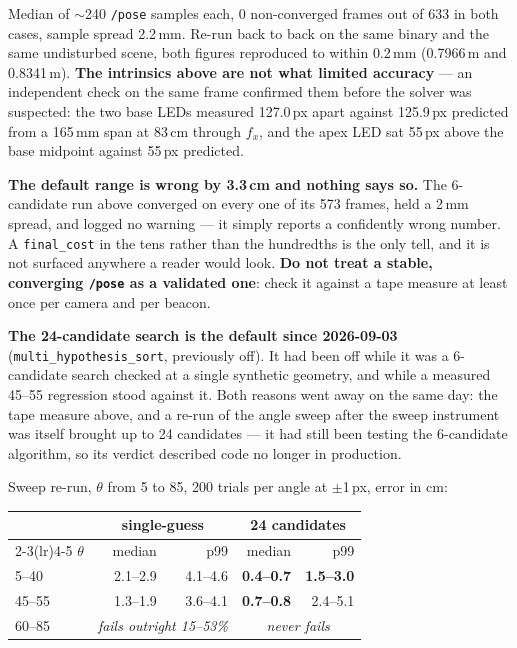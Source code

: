 \documentclass[11pt]{report}
\newenvironment{warningbox}%
  {\begin{lrbox}{\warnbox}\begin{minipage}{0.90\textwidth}}%
  {\end{minipage}\end{lrbox}%
   \begin{center}\fcolorbox{black}{codebg}{\usebox{\warnbox}}\end{center}}
\begin{document}
Median of $\sim$240 \texttt{/pose} samples each, 0 non-converged frames out
of 633 in both cases, sample spread 2.2\,mm. Re-run back to back on the same
binary and the same undisturbed scene, both figures reproduced to within
0.2\,mm (0.7966\,m and 0.8341\,m). \textbf{The intrinsics above
are not what limited accuracy} --- an independent check on the same frame
confirmed them before the solver was suspected: the two base LEDs measured
127.0\,px apart against 125.9\,px predicted from a 165\,mm span at 83\,cm
through $f_x$, and the apex LED sat 55\,px above the base midpoint against
55\,px predicted.

\begin{warningbox}
\textbf{The default range is wrong by 3.3\,cm and nothing says so.} The
6-candidate run above converged on every one of its 573 frames, held a 2\,mm
spread, and logged no warning --- it simply reports a confidently wrong
number. A \texttt{final\_cost} in the tens rather than the hundredths is the
only tell, and it is not surfaced anywhere a reader would look. \textbf{Do
not treat a stable, converging \texttt{/pose} as a validated one}: check it
against a tape measure at least once per camera and per beacon.
\end{warningbox}

\textbf{The 24-candidate search is the default since 2026-09-03}
(\texttt{multi\_hypothesis\_sort}, previously off). It had been off while it
was a 6-candidate search checked at a single synthetic geometry, and while a
measured 45--55\textdegree{} regression stood against it. Both reasons went
away on the same day: the tape measure above, and a re-run of the angle sweep
after the sweep instrument was itself brought up to 24 candidates --- it had
still been testing the 6-candidate algorithm, so its verdict described code
no longer in production.

Sweep re-run, $\theta$ from 5\textdegree{} to 85\textdegree{}, 200 trials per
angle at $\pm$1\,px, error in cm:

\begin{center}
\begin{tabular}{lrrrr}
\toprule
& \multicolumn{2}{c}{single-guess} & \multicolumn{2}{c}{24 candidates} \\
\cmidrule(lr){2-3}\cmidrule(lr){4-5}
$\theta$ & median & p99 & median & p99 \\
\midrule
5--40\textdegree{}  & 2.1--2.9 & 4.1--4.6 & \textbf{0.4--0.7} & \textbf{1.5--3.0} \\
45--55\textdegree{} & 1.3--1.9 & 3.6--4.1 & \textbf{0.7--0.8} & 2.4--5.1 \\
60--85\textdegree{} & \multicolumn{2}{c}{\emph{fails outright 15--53\%}} & \multicolumn{2}{c}{\emph{never fails}} \\
\bottomrule
\end{tabular}
\end{center}
\end{document}
